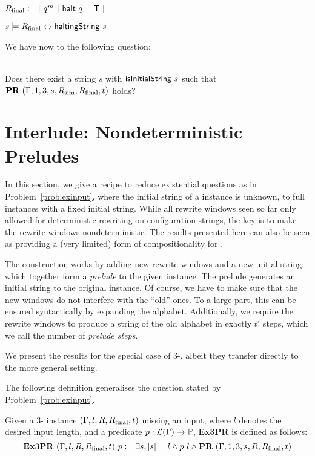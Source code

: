 \begin{definition}
  \mnote[finalSubstrings]{$\Rfinal$}
  $R_{\text{final}} \coloneqq \textbf{[}~ q^m ~\textbf{|}~ \textsf{halt}~q = \mathsf{T} ~\textbf{]}$
\end{definition}

\begin{proposition}
  $s \models R_{\text{final}} \leftrightarrow \textsf{haltingString}~s$
\end{proposition}

We have now  \gennp{} to the following question: 
\begin{problem}\label{prob:exinput}~\\
  Does there exist a string $s$ with $\textsf{isInitialString}~s$ such that $\textbf{PR}{}~(\Gamma, 1, 3, s, R_{\text{sim}}, R_{\text{final}}, t)$ holds?
\end{problem}

\section{Interlude: Nondeterministic Preludes}\label{sec:preludes}
In this section, we give a recipe to reduce existential questions as in Problem~\ref{prob:exinput}, where the initial string of a \PR{} instance is unknown, to full \PR{} instances with a fixed initial string. 
While all rewrite windows seen so far only allowed for deterministic rewriting on configuration strings, the key is to make the rewrite windows nondeterministic. The results presented here can also be seen as providing a (very limited) form of compositionality for \PR{}.

The construction works by adding new rewrite windows and a new initial string, which together form a \emph{prelude} to the given \PR{} instance. The prelude generates an initial string to the original instance. 
Of course, we have to make sure that the new windows do not interfere with the ``old'' ones. To a large part, this can be ensured syntactically by expanding the alphabet. Additionally, we require the rewrite windows to produce a string of the old alphabet in exactly $t'$ steps, which we call the number of \emph{prelude steps}. 

We present the results for the special case of 3-\PR{}, albeit they transfer directly to the more general setting.

The following definition generalises the question stated by Problem~\ref{prob:exinput}.
\newcommand{\expr}{\textbf{Ex3PR}}
\begin{definition}[Existential 3-\PR{} (\expr{})][ExPTPR]
  \mnote[ExPTPR]{\expr{}}
  Given a 3-\PR{} instance $(\Gamma, l, R, R_{\text{final}}, t)$ missing an input, where $l$ denotes the desired input length, and a predicate $p : \mathcal{L} (\Gamma) \rightarrow \mathbb{P}$, \expr{} is defined as follows:
  \[\expr{}~(\Gamma, l, R, \Rfinal, t)~p \defeq \exists s, \length{s} = l \land p~l \land \PR{}~(\Gamma, 1, 3, s, R, \Rfinal, t) \]
\end{definition}

